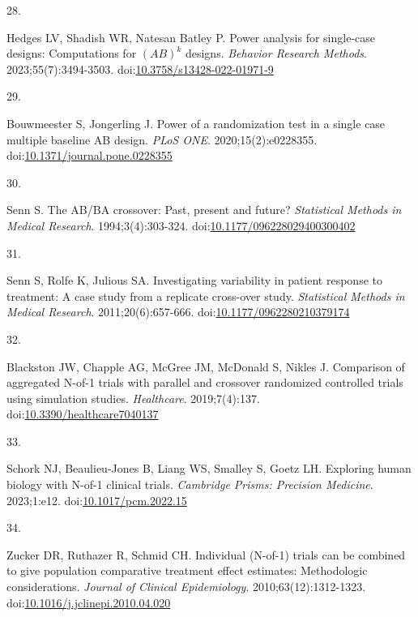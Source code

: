 \documentclass[
  11pt,
]{article}
\newlength{\cslhangindent}
\newlength{\csllabelwidth}
\newenvironment{CSLReferences}[2] %
 {\begin{list}{}{%
  \setlength{\itemindent}{0pt}
  \setlength{\leftmargin}{0pt}
  \setlength{\parsep}{0pt}
  \ifodd #1
   \setlength{\leftmargin}{\cslhangindent}
   \setlength{\itemindent}{-1\cslhangindent}
  \fi
  \setlength{\itemsep}{#2\baselineskip}}}
 {\end{list}}
\newcommand{\CSLLeftMargin}[1]{\parbox[t]{\csllabelwidth}{\strut#1\strut}}
\newcommand{\CSLRightInline}[1]{\parbox[t]{\linewidth - \csllabelwidth}{\strut#1\strut}}
\begin{document}
\begin{CSLReferences}{0}{1}
\CSLLeftMargin{28. }%
\CSLRightInline{Hedges LV, Shadish WR, Natesan Batley P. Power analysis for single-case designs: Computations for {\((AB)^k\)} designs. \emph{Behavior Research Methods}. 2023;55(7):3494-3503. doi:\href{https://doi.org/10.3758/s13428-022-01971-9}{10.3758/s13428-022-01971-9}}

\CSLLeftMargin{29. }%
\CSLRightInline{Bouwmeester S, Jongerling J. Power of a randomization test in a single case multiple baseline {AB} design. \emph{PLoS ONE}. 2020;15(2):e0228355. doi:\href{https://doi.org/10.1371/journal.pone.0228355}{10.1371/journal.pone.0228355}}

\CSLLeftMargin{30. }%
\CSLRightInline{Senn S. The {AB/BA} crossover: Past, present and future? \emph{Statistical Methods in Medical Research}. 1994;3(4):303-324. doi:\href{https://doi.org/10.1177/096228029400300402}{10.1177/096228029400300402}}

\CSLLeftMargin{31. }%
\CSLRightInline{Senn S, Rolfe K, Julious SA. Investigating variability in patient response to treatment: A case study from a replicate cross-over study. \emph{Statistical Methods in Medical Research}. 2011;20(6):657-666. doi:\href{https://doi.org/10.1177/0962280210379174}{10.1177/0962280210379174}}

\CSLLeftMargin{32. }%
\CSLRightInline{Blackston JW, Chapple AG, McGree JM, McDonald S, Nikles J. Comparison of aggregated {N}-of-1 trials with parallel and crossover randomized controlled trials using simulation studies. \emph{Healthcare}. 2019;7(4):137. doi:\href{https://doi.org/10.3390/healthcare7040137}{10.3390/healthcare7040137}}

\CSLLeftMargin{33. }%
\CSLRightInline{Schork NJ, Beaulieu-Jones B, Liang WS, Smalley S, Goetz LH. Exploring human biology with {N}-of-1 clinical trials. \emph{Cambridge Prisms: Precision Medicine}. 2023;1:e12. doi:\href{https://doi.org/10.1017/pcm.2022.15}{10.1017/pcm.2022.15}}

\CSLLeftMargin{34. }%
\CSLRightInline{Zucker DR, Ruthazer R, Schmid CH. Individual ({N}-of-1) trials can be combined to give population comparative treatment effect estimates: Methodologic considerations. \emph{Journal of Clinical Epidemiology}. 2010;63(12):1312-1323. doi:\href{https://doi.org/10.1016/j.jclinepi.2010.04.020}{10.1016/j.jclinepi.2010.04.020}}


\end{CSLReferences}
\end{document}
